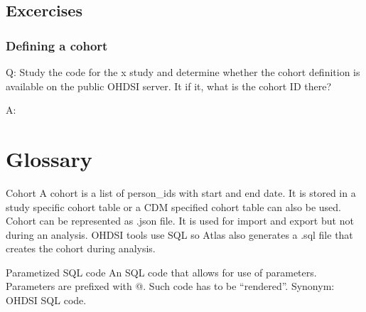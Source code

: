 \documentclass[]{book}
\begin{document}
\section{Excercises}\label{excercises}

\subsection{Defining a cohort}\label{defining-a-cohort}

Q: Study the code for the x study and determine whether the cohort
definition is available on the public OHDSI server. It if it, what is
the cohort ID there?

A:

\appendix


\chapter{Glossary}\label{Glossary}

Cohort A cohort is a list of person\_ids with start and end date. It is
stored in a study specific cohort table or a CDM specified cohort table
can also be used. Cohort can be represented as .json file. It is used
for import and export but not during an analysis. OHDSI tools use SQL so
Atlas also generates a .sql file that creates the cohort during
analysis.

Parametized SQL code An SQL code that allows for use of parameters.
Parameters are prefixed with @. Such code has to be ``rendered''.
Synonym: OHDSI SQL code.


\end{document}
